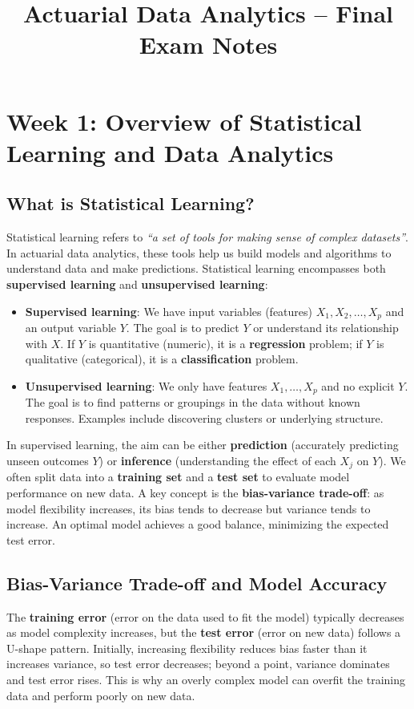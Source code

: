 \documentclass[11pt]{article}
\begin{document}
\title{Actuarial Data Analytics -- Final Exam Notes}
\author{}
\date{}
\maketitle

\tableofcontents

\section{Week 1: Overview of Statistical Learning and Data Analytics}
\subsection{What is Statistical Learning?}
Statistical learning refers to \textit{``a set of tools for making sense of complex datasets''}. In actuarial data analytics, these tools help us build models and algorithms to understand data and make predictions. Statistical learning encompasses both \textbf{supervised learning} and \textbf{unsupervised learning}:
\begin{itemize}
    \item \textbf{Supervised learning}: We have input variables (features) $X_1, X_2, \ldots, X_p$ and an output variable $Y$. The goal is to predict $Y$ or understand its relationship with $X$. If $Y$ is quantitative (numeric), it is a \textbf{regression} problem; if $Y$ is qualitative (categorical), it is a \textbf{classification} problem.
    \item \textbf{Unsupervised learning}: We only have features $X_1,\ldots,X_p$ and no explicit $Y$. The goal is to find patterns or groupings in the data without known responses. Examples include discovering clusters or underlying structure.
\end{itemize}

In supervised learning, the aim can be either \textbf{prediction} (accurately predicting unseen outcomes $Y$) or \textbf{inference} (understanding the effect of each $X_j$ on $Y$). We often split data into a \textbf{training set} and a \textbf{test set} to evaluate model performance on new data. A key concept is the \textbf{bias-variance trade-off}: as model flexibility increases, its bias tends to decrease but variance tends to increase. An optimal model achieves a good balance, minimizing the expected test error.

\subsection{Bias-Variance Trade-off and Model Accuracy}
The \textbf{training error} (error on the data used to fit the model) typically decreases as model complexity increases, but the \textbf{test error} (error on new data) follows a U-shape pattern. Initially, increasing flexibility reduces bias faster than it increases variance, so test error decreases; beyond a point, variance dominates and test error rises. This is why an overly complex model can overfit the training data and perform poorly on new data.
\end{document}
